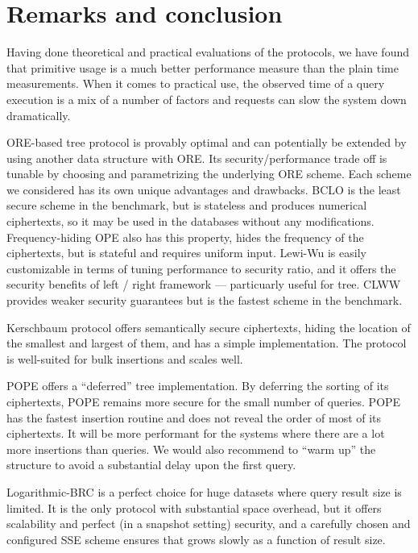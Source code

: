 \section{Remarks and conclusion}\label{sec:conclusion}

	Having done theoretical and practical evaluations of the protocols, we have found that primitive usage is a much better performance measure than the plain time measurements.
	When it comes to practical use, the observed time of a query execution is a mix of a number of factors and {\IO} requests can slow the system down dramatically.

	ORE-based {\BPlus} tree protocol is provably {\IO} optimal and can potentially be extended by using another data structure with ORE\@.
	Its security/performance trade off is tunable by choosing and parametrizing the underlying ORE scheme.
	Each scheme we considered has its own unique advantages and drawbacks.
	BCLO \cite{bclo-ope} is the least secure scheme in the benchmark, but is stateless and produces numerical ciphertexts, so it may be used in the databases without any modifications.
	Frequency-hiding OPE \cite{fh-ope} also has this property, hides the frequency of the ciphertexts, but is stateful and requires uniform input.
	Lewi-Wu \cite{lewi-wu-ore} is easily customizable in terms of tuning performance to security ratio, and it offers the security benefits of left / right framework --- particuarly useful for {\BPlus} tree.
	CLWW \cite{clww-ore} provides weaker security guarantees but is the fastest scheme in the benchmark.

	Kerschbaum protocol \cite{florian-protocol} offers semantically secure ciphertexts, hiding the location of the smallest and largest of them, and has a simple implementation.
	The protocol is well-suited for bulk insertions and scales well.

	\balance%

	POPE \cite{pope} offers a ``deferred'' {\BPlus} tree implementation.
	By deferring the sorting of its ciphertexts, POPE remains more secure for the small number of queries.
	POPE has the fastest insertion routine and does not reveal the order of most of its ciphertexts.
	It will be more performant for the systems where there are a lot more insertions than queries.
	We would also recommend to ``warm up'' the structure to avoid a substantial delay upon the first query.

	Logarithmic\hyp{}BRC is a perfect choice for huge datasets where query result size is limited.
	It is the only protocol with substantial space overhead, but it offers scalability and perfect (in a snapshot setting) security,
	and a carefully chosen and configured SSE scheme ensures that {\IO} grows slowly as a function of result size.

